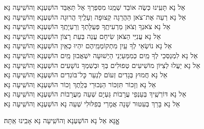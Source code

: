 \documentclass[twoside, openany, parskip=half, 11pt]{book}
\begin{document}
\begin{small}
אֵל נָא תָּעִֽינוּ כְּשֶׂה אוֹבֵד שְׁמֵֽנוּ מִסִּפְרְךָ אַל תְּאַבֵּד \hfill הוֹשַׁעְנָא וְהוֹשִֽׁיעָה נָּא׃ \\
אֵל נָא רְעֵה אֶת־צֹאן הַהֲרֵגָה קְצוּפָה וְעָלֶֽיךָ הֲרוּגָה \hfill הוֹשַׁעְנָא וְהוֹשִֽׁיעָה נָּא׃\\
אֵל נָא צֹאנְךָ וְצֹאן מַרְעִיתֶֽךָ פְּעֻלָּתְךָ וְרַעְיָתֶֽךָ \hfill הוֹשַׁעְנָא וְהוֹשִֽׁיעָה נָּא׃\\
אֵל נָא עֲנִיֵּי הַצֹּאן שִׂיחָם עֲנֵה בְּעֵת רָצוֹן \hfill הוֹשַׁעְנָא וְהוֹשִֽׁיעָה נָּא׃\\
אֵל נָא נוֹשְׂאֵי לְךָ עַֽיִן מִתְקוֹמְמֵֽיהֶם יִהְיוּ כְאַֽיִן \hfill הוֹשַׁעְנָא וְהוֹשִֽׁיעָה נָּא׃\\
אֵל נָא לִמְנַסְּכֵי לְךָ מַֽיִם כְּמִמַּעַיְנֵי הַיְשׁוּעָה יִשְׁאֲבוּן מַֽיִם \hfill הוֹשַׁעְנָא וְהוֹשִֽׁיעָה נָּא׃\\
אֵל נָא יַעֲלוּ לְצִיּוֹן מוֹשִׁיעִים טְפוּלִים בְּךָ וּבְשִׁמְךָ נוֹשָׁעִים \hfill הוֹשַׁעְנָא וְהוֹשִֽׁיעָה נָּא׃\\
אֵל נָא חֲמוּץ בְּגָדִים זְעוֹם לְנַעֵר כׇּל־בּוֹגְדִים \hfill הוֹשַׁעְנָא וְהוֹשִֽׁיעָה נָּא׃\\
אֵל נָא וְזָכוֹר תִּזְכּוֹר הַנְּכוּרֵי בְּלֶֽתֶךְ וָכוֹר \hfill הוֹשַׁעְנָא וְהוֹשִֽׁיעָה נָּא׃\\
אֵל נָא דּוֹרְשֶֽׁיךָ בְּעַנְפֵי עֲרָבוֹת גַּעְיָם שְׁעֵה מֵעֲרָבוֹת \hfill הוֹשַׁעְנָא וְהוֹשִֽׁיעָה נָּא׃\\
אֵל נָא בָּרֵךְ בְּעִטּוּר שָׁנָה אֲמָרַי בְּפִלּוּלִי שְׁעֵה נָא \hfill הוֹשַׁעְנָא וְהוֹשִֽׁיעָה נָּא׃

\end{small}

\begin{large}
\shatzvkahal
אׇׇׇנָּא אֵל נָא הוֹשַׁעְנָא וְהוֹשִֽׁיעָה נָּא אָבִֽינוּ אַֽתָּה׃

\end{large}
\end{document}
